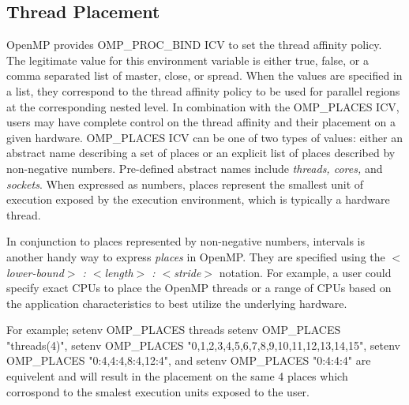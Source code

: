\subsection{Thread Placement}
OpenMP provides OMP\_PROC\_BIND ICV to set the thread affinity policy. The legitimate value for 
this environment variable is either true, false, or a comma separated list of master, close, or spread. 
When the values are specified in a list, they correspond to the thread affinity policy to be used for 
parallel regions at the corresponding nested level. In combination with the OMP\_PLACES ICV, 
users may have complete control on the thread affinity and their placement on a given hardware. 
OMP\_PLACES ICV can be one of two types of values: either an abstract name describing a set 
of places or an explicit list of places described by non-negative numbers. Pre-defined abstract 
names include \textit{threads, cores,} and \textit{sockets}. When expressed as numbers, places 
represent the smallest unit of execution exposed by the execution environment, which is typically 
a hardware thread.

In conjunction to places represented by non-negative numbers, intervals is another handy way to 
express \textit{places} in OpenMP. They are specified using the \textit{$<$lower-bound$>$ : $<$length$>$ : $<$stride$>$} notation. For example, a user could specify exact CPUs to place the OpenMP threads or a range of CPUs based on the application characteristics to best utilize the underlying hardware.

For example; setenv OMP_PLACES threads
setenv OMP_PLACES "threads(4)", setenv OMP_PLACES "{0,1,2,3},{4,5,6,7},{8,9,10,11},{12,13,14,15}", setenv OMP_PLACES "{0:4},{4:4},{8:4},{12:4}", and setenv OMP_PLACES "{0:4}:4:4" are equivelent and will result in the placement on the same 4 places which corrospond to the smalest execution units exposed to the user.
